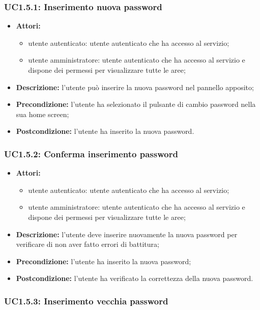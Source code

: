 \subsubsection{UC1.5.1: Inserimento nuova password}

\begin{itemize}
   	\item \textbf{Attori:}
    \begin{itemize}
    	\item utente autenticato: utente autenticato che ha accesso al servizio;
    	\item utente amministratore: utente autenticato che ha accesso al servizio e dispone dei permessi per visualizzare tutte le aree;
	\end{itemize}
    \item \textbf{Descrizione:} l'utente può inserire la nuova password nel pannello apposito;
    \item \textbf{Precondizione:} l'utente ha selezionato il pulsante di cambio password nella sua home screen;
    \item \textbf{Postcondizione:} l'utente ha inserito la nuova password.
\end{itemize}

\subsubsection{UC1.5.2: Conferma inserimento password }

\begin{itemize}
   	\item \textbf{Attori:}
    \begin{itemize}
    	\item utente autenticato: utente autenticato che ha accesso al servizio;
    	\item utente amministratore: utente autenticato che ha accesso al servizio e dispone dei permessi per visualizzare tutte le aree;
	\end{itemize}
    \item \textbf{Descrizione:} l'utente deve inserire nuovamente la nuova password per verificare di non aver fatto errori di battitura;
    \item \textbf{Precondizione:} l'utente ha inserito la nuova password;
    \item \textbf{Postcondizione:} l'utente ha verificato la correttezza della nuova password.
\end{itemize}

\subsubsection{UC1.5.3: Inserimento vecchia password}

